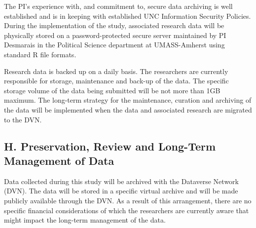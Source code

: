The PI's experience with, and commitment to, secure data archiving is well established and
is in keeping with established UNC Information Security Policies. During the implementation of the
study, associated research data will be physically stored on a password-protected secure server
maintained by PI Desmarais in the Political Science department at UMASS-Amherst using standard R file formats. %

Research data is backed up on a daily basis. The researchers are currently responsible for storage,
maintenance and back-up of the data. The specific storage volume of the data being submitted will be
not more than 1GB maximum. The long-term strategy for the maintenance, curation and archiving of
the data will be implemented when the data and associated research are migrated to the DVN.

\subsection*{H. Preservation, Review and Long-Term Management of Data }
Data collected during this study will be archived with the Dataverse Network (DVN). The data will be
stored in a specific virtual archive and will be made publicly available through the DVN.
As a result of this arrangement, there are no specific financial considerations of which the researchers
are currently aware that might impact the long-term management of the data. 







